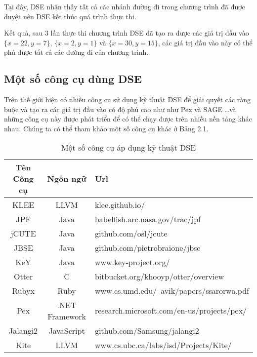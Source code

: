 Tại đây, DSE nhận thấy tất cả các nhánh đường đi trong chương trình đã được 
duyệt nên DSE kết thúc quá trình thực thi. 

Kết quả, sau $ 3 $ lần thực thi chương trình DSE đã tạo ra được các giá trị 
đầu vào $ \{x = 22, y = 7\} $, $ \{x = 2, y = 1\} $ và $ \{x = 30, y = 15\} $, 
các giá trị đầu vào này có thể phủ được tất cả các đường đi của chương trình.
	
\subsection{Một số công cụ dùng DSE}	

Trên thế giới hiện có nhiều công cụ sử dụng kỹ thuật DSE để giải quyết
các ràng buộc và tạo ra các giá trị đầu vào có độ phủ cao như như Pex
\cite{tillmann2008pex} và SAGE \cite{godefroid2008automated}\dots và
những công cụ này được phát triển để có thể chạy được trên nhiều nền
tảng khác nhau. Chúng ta có thể tham khảo một số công cụ khác ở Bảng 2.1.
		
\begin{table}[H]
  \centering
  \label{tbl:Tools}
  \caption{Một số công cụ áp dụng kỹ thuật DSE}
  \begin{tabular} {|c|c|l|}
    \hline 
    \textbf{Tên Công cụ} & \textbf{Ngôn ngữ} & \textbf{Url} \\ 
    \hline 
    KLEE & LLVM & klee.github.io/ \\ 
    \hline 
    JPF	 & Java	& babelfish.arc.nasa.gov/trac/jpf \\
    \hline 
    jCUTE &	Java &	github.com/osl/jcute \\
    \hline 
    JBSE	& Java	 & github.com/pietrobraione/jbse \\
    \hline 
    KeY &	Java &	www.key-project.org/ \\	    
    \hline 
    Otter &	C	& bitbucket.org/khooyp/otter/overview \\
    \hline 
    Rubyx & 	Ruby &	www.cs.umd.edu/~avik/papers/ssarorwa.pdf \\
    \hline 
    Pex	& .NET Framework	 & research.microsoft.com/en-us/projects/pex/ \\
    \hline 
    Jalangi2 &	JavaScript &	github.com/Samsung/jalangi2 \\
    \hline 
    Kite &	LLVM &	www.cs.ubc.ca/labs/isd/Projects/Kite/ \\
    \hline 
  \end{tabular} 
\end{table}
	
